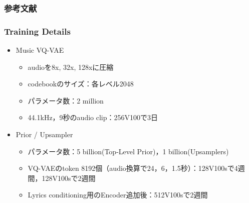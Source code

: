 \documentclass[dvipdfmx]{beamer}
\begin{document}


\begin{frame}
    \frametitle{参考文献}
    \beamertemplatetextbibitems
    
    
 \end{frame}





 \begin{frame}
     \frametitle{Training Details}
     \begin{itemize}
         \item Music VQ-VAE
         \begin{itemize}
             \item audioを8x, 32x, 128xに圧縮
             \item codebookのサイズ：各レベル2048
             \item パラメータ数：2 million
             \item 44.1kHz，9秒のaudio clip：256V100で3日
         \end{itemize}
         \vspace{\baselineskip}
         \item Prior / Upsampler
         \begin{itemize}
             \item パラメータ数：5 billion(Top-Level Prior)，1 billion(Upsamplers)
             \item VQ-VAEのtoken 8192個（audio換算で24，6，1.5秒）：128V100sで4週間，128V100sで2週間
             \item Lyrics conditioning用のEncoder追加後：512V100sで2週間
         \end{itemize}
     \end{itemize}
 \end{frame}
\end{document}
